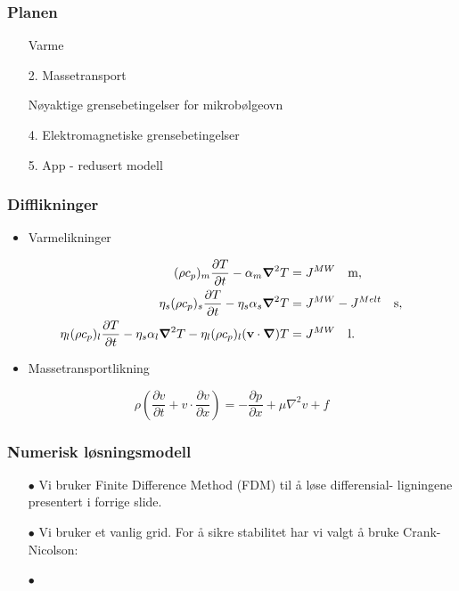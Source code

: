 \documentclass[screen]{beamer}
\renewcommand{\v}[1]{\ensuremath{\mathbf{#1}}} %
\newcommand{\gv}[1]{\ensuremath{\mbox{\boldmath$ #1 $}}}
\newcommand{\pd}[2]{\frac{\partial #1}{\partial #2}}
\newcommand{\grad}[1]{\gv{\nabla} #1} %
\newcommand{\checktick}{\textcolor{green}{\checked}}
\begin{document}
\begin{frame}
  \frametitle{Planen}
  \begin{enumerate}
  \item[\checktick] Varme
  \item[2.] Massetransport
  \item[\checktick] Nøyaktige grensebetingelser for mikrobølgeovn
\end{enumerate}
    \hline
\begin{enumerate}
  \item[4.] Elektromagnetiske grensebetingelser
  \item[5.] App - redusert modell
  \end{enumerate}
\end{frame}

\begin{frame}
\frametitle{Difflikninger}
\begin{itemize}
  \item Varmelikninger
\end{itemize}
\begin{align}
  \label{eq:temp}
  (\rho c_p)_m \pd{T}{t} - \alpha_m \grad{^2 T} &= J^{MW} \quad \rm{m,} \\
  \eta_s (\rho c_p)_s \pd{T}{t} - \eta_s\alpha_s \grad{^2 T} &= J^{MW} - J^{Melt}  \quad \rm{s,} \\
  \eta_l (\rho c_p)_l \pd{T}{t} - \eta_s\alpha_l \grad{^2 T} - \eta_l(\rho c_p)_l(\v{v}\cdot
  \grad{})T &= J^{MW}  \quad \rm{l.}
\end{align}
\begin{itemize}
  \item Massetransportlikning
\end{itemize}
\begin{equation}
  \rho \left(\pd{v}{t} + v \cdot \pd{v}{x}\right) = -\pd{p}{x} + \mu \nabla^2 v + f
 \label{eq:navier-stokes}
\end{equation}
\end{frame}

\begin{frame}
  \frametitle{Numerisk løsningsmodell}
  \begin{itemize}
    \item[$\bullet$] Vi bruker Finite Difference Method (FDM) til å løse differensial-
ligningene presentert i forrige slide.

\item[$\bullet$] Vi bruker et vanlig grid. For å sikre stabilitet har vi valgt
å bruke Crank-Nicolson:

\item[$\bullet$] 

  \end{itemize}
\end{frame}
\end{document}
